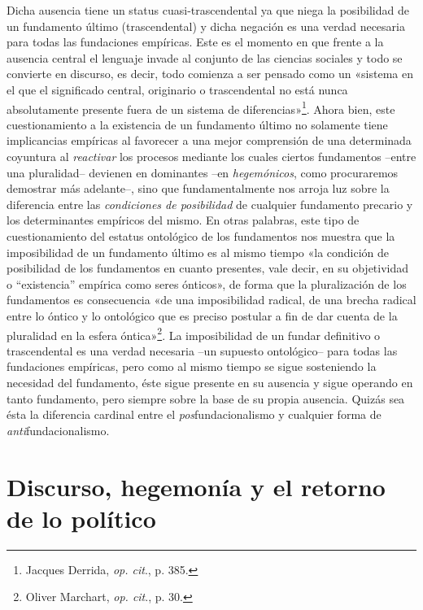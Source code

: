 Dicha ausencia tiene un status cuasi-trascendental ya que niega la posibilidad de un fundamento último (trascendental) y dicha negación es una verdad necesaria para todas las fundaciones empíricas. Este es el momento en que frente a la ausencia central el lenguaje invade al conjunto de las ciencias sociales y todo se convierte en discurso, es decir, todo comienza a ser pensado como un «sistema en el que el significado central, originario o trascendental no está nunca absolutamente presente fuera de un sistema de diferencias»\footnote{Jacques Derrida, \emph{op. cit}., p. 385.}. Ahora bien, este cuestionamiento a la existencia de un fundamento último no solamente tiene implicancias empíricas al favorecer a una mejor comprensión de una determinada coyuntura al \emph{reactivar} los procesos mediante los cuales ciertos fundamentos --entre una pluralidad-- devienen en dominantes --en \emph{hegemónicos}, como procuraremos demostrar más adelante--, sino que fundamentalmente nos arroja luz sobre la diferencia entre las \emph{condiciones de posibilidad} de cualquier fundamento precario y los determinantes empíricos del mismo. En otras palabras, este tipo de cuestionamiento del estatus ontológico de los fundamentos nos muestra que la imposibilidad de un fundamento último es al mismo tiempo «la condición de posibilidad de los fundamentos en cuanto presentes, vale decir, en su objetividad o ``existencia'' empírica como seres ónticos», de forma que la pluralización de los fundamentos es consecuencia «de una imposibilidad radical, de una brecha radical entre lo óntico y lo ontológico que es preciso postular a fin de dar cuenta de la pluralidad en la esfera óntica»\footnote{Oliver Marchart, \emph{op. cit}., p. 30.}. La imposibilidad de un fundar definitivo o trascendental es una verdad necesaria --un supuesto ontológico-- para todas las fundaciones empíricas, pero como al mismo tiempo se sigue sosteniendo la necesidad del fundamento, éste sigue presente en su ausencia y sigue operando en tanto fundamento, pero siempre sobre la base de su propia ausencia. Quizás sea ésta la diferencia cardinal entre el \emph{pos}fundacionalismo y cualquier forma de \emph{anti}fundacionalismo.


\section{Discurso, hegemonía y el retorno de lo político}

